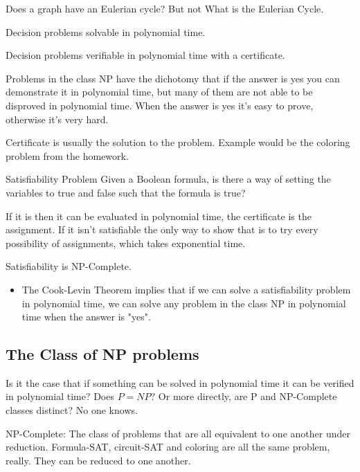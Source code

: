 \documentclass[english, 10pt]{article}
\begin{document}
Does a graph have an Eulerian cycle? But not What is the Eulerian Cycle.

\begin{defn}[P]
    Decision problems solvable in polynomial time.
\end{defn}

\begin{defn}[NP]
    Decision problems verifiable in polynomial time with a certificate.
\end{defn}

Problems in the class NP have the dichotomy that if the answer is yes you can
demonstrate it in polynomial time, but many of them are not able to be
disproved in polynomial time. When the answer is yes it's easy to prove, otherwise it's very hard.

Certificate is usually the solution to the problem. Example would be the coloring problem from the homework.


\begin{defn}[SAT]
Satisfiability Problem Given a Boolean formula, is there a way of setting the variables to true and
false such that the formula is true?
\end{defn}

If it is then it can be evaluated in polynomial time, the certificate is the
assignment. If it isn't satisfiable the only way to show that is to try every
possibility of assignments, which takes exponential time.

\begin{thrm}
    Satisfiability is NP-Complete.
\end{thrm}

\begin{itemize}
    \item The Cook-Levin Theorem implies that if we can solve a satisfiability problem in polynomial time, we can solve any problem in the class NP in polynomial time when the answer is "yes". 
\end{itemize}
    
\subsection{The Class of NP problems}

Is it the case that if something can be solved in polynomial time it can be verified in polynomial time?
Does $P = NP$? Or more directly, are P and NP-Complete classes distinct?
No one knows.

NP-Complete: The class of problems that are all equivalent to one another under
reduction.  Formula-SAT, circuit-SAT and coloring are all the same problem,
really. They can be reduced to one another.
\end{document}
